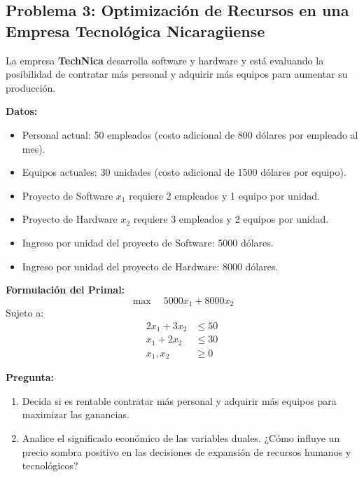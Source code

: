 \documentclass{article}
\begin{document}
\begin{problem}
\subsection*{Problema 3: Optimización de Recursos en una Empresa Tecnológica Nicaragüense}

La empresa \textbf{TechNica} desarrolla software y hardware y está evaluando la posibilidad de contratar más personal y adquirir más equipos para aumentar su producción.

\textbf{Datos:}
\begin{itemize}
    \item Personal actual: 50 empleados (costo adicional de 800 dólares por empleado al mes).
    \item Equipos actuales: 30 unidades (costo adicional de 1500 dólares por equipo).
    \item Proyecto de Software \( x_1 \) requiere 2 empleados y 1 equipo por unidad.
    \item Proyecto de Hardware \( x_2 \) requiere 3 empleados y 2 equipos por unidad.
    \item Ingreso por unidad del proyecto de Software: 5000 dólares.
    \item Ingreso por unidad del proyecto de Hardware: 8000 dólares.
\end{itemize}

\textbf{Formulación del Primal:}
\[
\max \quad 5000x_1 + 8000x_2
\]
Sujeto a:
\[
\begin{aligned}
    2x_1 + 3x_2 &\leq 50 \\
    x_1 + 2x_2 &\leq 30 \\
    x_1, x_2 &\geq 0
\end{aligned}
\]

\textbf{Pregunta:}
\begin{enumerate}
    \item Decida si es rentable contratar más personal y adquirir más equipos para maximizar las ganancias.
    \item Analice el significado económico de las variables duales. ¿Cómo influye un precio sombra positivo en las decisiones de expansión de recursos humanos y tecnológicos?
\end{enumerate}

\end{problem}
\end{document}
